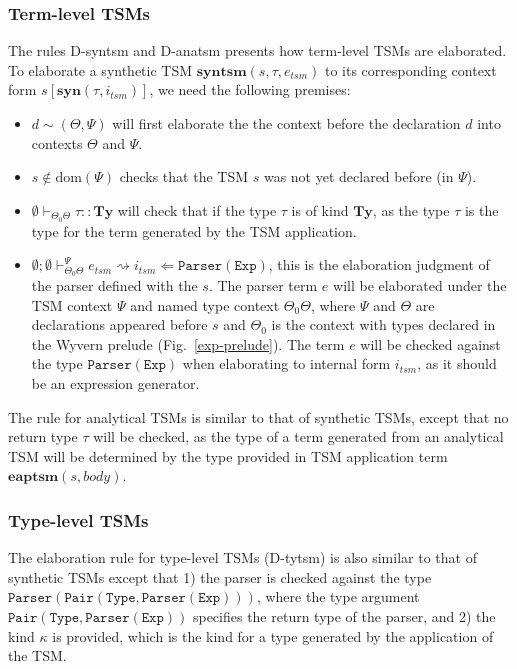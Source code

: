 \subsubsection{Term-level TSMs}
The rules D-syntsm and D-anatsm presents how term-level TSMs are elaborated. To elaborate a synthetic TSM $\mathbf{syntsm}(s,\tau,e_{tsm})$ to its corresponding context form $s[\mathbf{syn}(\tau,i_{tsm})]$, we need the following premises:
\begin{itemize}\itemsep0pt
\item $d\sim(\Theta,\Psi)$ will first elaborate the the context before the declaration $d$ into contexts $\Theta$ and $\Psi$.
\item $s\notin\text{dom}(\Psi)$ checks that the TSM $s$ was not yet declared before (in $\Psi$).
\item $\emptyset\vdash_{\Theta_0\Theta}\tau::\mathbf{Ty}$ will check that if the type $\tau$ is of kind $\mathbf{Ty}$, as the type $\tau$ is the type for the term generated by the TSM application.
\item $\emptyset;\emptyset\vdash_{\Theta_0\Theta}^{\Psi}e_{tsm}\rightsquigarrow i_{tsm} \Leftarrow \mathtt{Parser(Exp)}$, this is the elaboration judgment of the parser defined with the $s$. The parser term $e$ will be elaborated under the TSM context $\Psi$ and named type context $\Theta_0\Theta$, where $\Psi$ and $\Theta$ are declarations appeared before $s$ and $\Theta_0$ is the context with types declared in the Wyvern prelude (Fig.~\ref{exp-prelude}). The term $e$ will be checked against the type $\mathtt{Parser(Exp)}$ when elaborating to internal form $i_{tsm}$, as it should be an expression generator.
\end{itemize}

The rule for analytical TSMs is similar to that of synthetic TSMs, except that no return type $\tau$ will be checked, as the type of a term generated from an analytical TSM will be determined by the type provided in TSM application term $\mathbf{eaptsm}(s,body)$.

\subsubsection{Type-level TSMs}
The elaboration rule for type-level TSMs (D-tytsm) is also similar to that of synthetic TSMs except that 1) the parser is checked against the type $\mathtt{Parser(Pair(Type,Parser(Exp)))}$, where the type argument $\mathtt{Pair(Type,Parser(Exp))}$ specifies the return type of the parser, and 2) the kind $\kappa$ is provided, which is the kind for a type generated by the application of the TSM.

